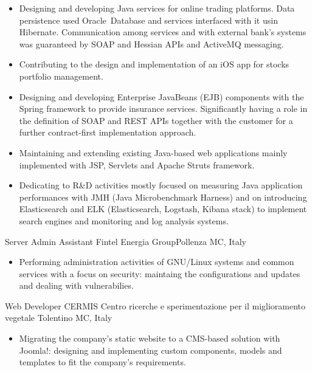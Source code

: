   {}{
\begin{itemize}
  \item Designing and developing Java services for online trading platforms.
    Data persistence used Oracle~Database and services interfaced with it usin
    Hibernate.
    Communication among services and with external bank's systems was guaranteed
    by SOAP and Hessian APIs and ActiveMQ messaging.
  \item Contributing to the design and implementation of an iOS app for stocks
    portfolio management.
  \item Designing and developing Enterprise JavaBeans (EJB) components with the
    Spring framework to provide insurance services.
    Significantly having a role in the definition of SOAP and REST APIs together
    with the customer for a further contract-first implementation approach.
	\item Maintaining and extending existing Java-based web applications mainly
    implemented with JSP, Servlets and Apache Struts framework.
  \item Dedicating to R\&D activities mostly focused on measuring Java
    application performances with JMH (Java Microbenchmark Harness) and on
    introducing Elasticsearch and ELK (Elasticsearch, Logstash, Kibana stack) to
    implement search engines and monitoring and log analysis systems.
\end{itemize}
}
%
  {Server Admin Assistant}
  {Fintel Energia Group}{Pollenza MC, Italy}
  {}{
\begin{itemize}
	\item Performing administration activities of GNU/Linux systems and common
    services with a focus on security: maintaing the configurations and updates
    and dealing with vulnerabilies.
\end{itemize}
}
%
  {Web Developer}
  {CERMIS Centro ricerche e sperimentazione per il miglioramento vegetale}
  {Tolentino MC, Italy}
  {}{
\begin{itemize}
\item Migrating the company's static website to a CMS-based solution with
  Joomla!: designing and implementing custom components, models and templates to
  fit the company's requirements.
\end{itemize}
}
